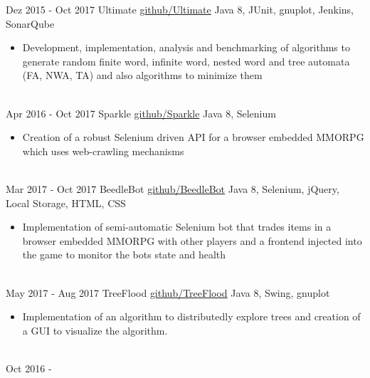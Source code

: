 \documentclass[letterpaper]{twentysecondcv} %
\begin{document}
\newpage

\makesidebarThird %

\vspace{10mm}

\begin{twenty}
	\twentyitem
    		{Dez 2015 -}
		{Oct 2017}
        		{Ultimate}
        		{\href{https://github.com/ultimate-pa/ultimate}{github/Ultimate}}
        		{Java 8, JUnit, gnuplot, Jenkins, SonarQube}
        		{\begin{itemize}
        			\item Development, implementation, analysis and benchmarking of algorithms to generate random finite word,
        			infinite word, nested word and tree automata (FA, NWA, TA) and also algorithms to minimize them
        		\end{itemize}}\\
	\twentyitem
    		{Apr 2016 -}
		{Oct 2017}
        		{Sparkle}
        		{\href{https://github.com/Zabuzard/Sparkle}{github/Sparkle}}
        		{Java 8, Selenium}
        		{\begin{itemize}
        			\item Creation of a robust Selenium driven API for a browser embedded MMORPG which uses web-crawling mechanisms
        		\end{itemize}}\\
	\twentyitem
    		{Mar 2017 -}
		{Oct 2017}
        		{BeedleBot}
        		{\href{https://github.com/Zabuzard/BeedleBot}{github/BeedleBot}}
        		{Java 8, Selenium, jQuery, Local Storage, HTML, CSS}
        		{\begin{itemize}
        			\item Implementation of semi-automatic Selenium bot that trades items in a browser embedded MMORPG
	        			with other players and a frontend injected into the game to monitor the bots state and health
        		\end{itemize}}\\
	\twentyitem
    		{May 2017 -}
		{Aug 2017}
        		{TreeFlood}
        		{\href{https://github.com/Zabuzard/TreeFlood}{github/TreeFlood}}
        		{Java 8, Swing, gnuplot}
        		{\begin{itemize}
        			\item Implementation of an algorithm to distributedly explore trees and creation of a GUI to visualize the algorithm.
        		\end{itemize}}\\
	\twentyitem
    		{Oct 2016 -}

\end{twenty}
\end{document}
